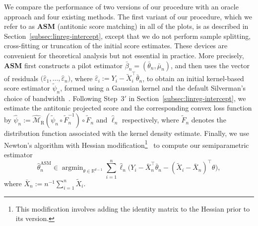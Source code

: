 \documentclass[a4paper]{article}
\DeclareMathOperator*{\argmin}{argmin}
\theoremstyle{definition}
\begin{document}
We compare the performance of two versions of our procedure with an oracle approach and four existing methods. The first variant of our procedure, which we refer to as \textbf{ASM} (antitonic score matching) in all of the plots, is as described in Section~\ref{subsec:linreg-intercept}, except that we do not perform sample splitting, cross-fitting or truncation of the initial score estimates. These devices are convenient for theoretical analysis but not essential in practice. More precisely, \textbf{ASM} first constructs a pilot estimator $\bar{\beta}_n = (\bar{\theta}_n,\bar{\mu}_n)$, and then uses the vector of residuals $\bigl( \hat{\varepsilon}_1,\dotsc,\hat{\varepsilon}_n \bigr)$, where $\hat{\varepsilon}_i := Y_i - \tilde{X}_i^\top\bar{\theta}_n$, to obtain an initial kernel-based score estimator $\tilde{\psi}_n$, formed using a Gaussian kernel and the default Silverman's choice of bandwidth~\citep[p.~48]{silverman1986density}. Following Step~3$'$ in Section~\ref{subsec:linreg-intercept}, we estimate the antitonic projected score and the corresponding convex loss function by $\hat{\psi}_n := \widehat{\mathcal{M}}_{\mathrm{R}}(\tilde{\psi}_n \circ \tilde{F}_n^{-1}) \circ \tilde{F}_n$ and $\hat{\ell}_n$ respectively, where $\tilde{F}_n$ denotes the distribution function associated with the kernel density estimate. Finally, we use Newton's algorithm with Hessian modification\footnote{This modification involves adding the identity matrix to the Hessian prior to its version.}~\citep[Section~3.4]{nocedal2006numerical} to compute our semiparametric estimator
\[
\hat{\theta}_n^{\mathrm{ASM}} \in \argmin_{\theta \in \mathbb{R}^{d-1}} \sum_{i=1}^n \hat{\ell}_n\bigl(Y_i - \bar{X}_n^\top \bar{\theta}_n - (\tilde{X}_i - \bar{X}_n)^\top \theta \bigr),
\]
where $\bar{X}_n := n^{-1} \sum_{i=1}^n \tilde{X}_i$.
\end{document}
